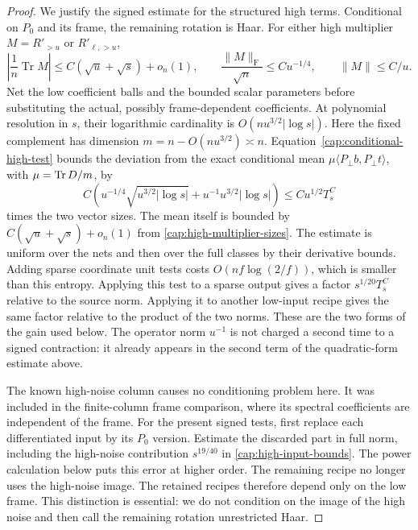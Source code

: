 \begin{proof}
We justify the signed estimate for the structured high terms. Conditional on
$P_0$ and its frame, the remaining rotation is Haar. For either high
multiplier $M=R'_{>u}$ or $R'_{\ell,>u}$,
\begin{equation}\label{cap:high-multiplier-sizes}
 \left|\frac1n\operatorname{Tr}M\right|
       \le C(\sqrt u+\sqrt s)+o_n(1),\qquad
 \frac{\|M\|_{\mathrm F}}{\sqrt n}\le Cu^{-1/4},
 \qquad \|M\|\le C/u.
\end{equation}
Net the low coefficient balls and the bounded scalar parameters before
substituting the actual, possibly frame-dependent coefficients. At polynomial
resolution in \(s\), their logarithmic cardinality is
\(O(nu^{3/2}|\log s|)\). Here the fixed complement has dimension
\(m=n-O(nu^{3/2})\asymp n\). Equation~\eqref{cap:conditional-high-test}
bounds the deviation from the exact conditional mean
\(\mu\langle P_\perp b,P_\perp t\rangle\), with \(\mu=\operatorname{Tr} D/m\), by
\[
 C\left(u^{-1/4}\sqrt{u^{3/2}|\log s|}
                  +u^{-1}u^{3/2}|\log s|\right)
 \le Cu^{1/2}T_s^C
\]
times the two vector sizes. The mean itself is bounded by
\(C(\sqrt u+\sqrt s)+o_n(1)\) from \eqref{cap:high-multiplier-sizes}.
The estimate is uniform over the nets and then over the full
classes by their derivative bounds. Adding sparse coordinate unit tests costs
$O(nf\log(2/f))$, which is smaller than this entropy. Applying this test to a
sparse output gives a factor $s^{1/20}T_s^C$ relative to the source norm.
Applying it to another low-input recipe gives the same factor relative to the
product of the two norms. These are the two forms of the gain used below. The
operator norm $u^{-1}$ is not charged a second time to a signed contraction:
it already appears in the second term of the quadratic-form estimate above.

The known high-noise column causes no conditioning problem here. It was
included in the finite-column frame comparison, where its spectral
coefficients are independent of the frame. For the present signed tests, first
replace each differentiated input by its $P_0$ version. Estimate the discarded
part in full norm, including the high-noise contribution $s^{19/40}$ in
\eqref{cap:high-input-bounds}. The power calculation below puts this error at
higher order. The remaining recipe no longer uses the high-noise image. The
retained recipes therefore depend only on the low frame. This distinction is
essential: we do not condition on the image of the high noise and then call
the remaining rotation unrestricted Haar.


\end{proof}
